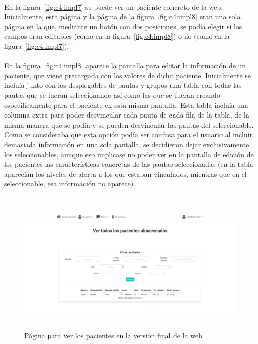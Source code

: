 \paragraph{}
En la figura~\ref{fig:c4:impl7} se puede ver un paciente concreto de la web. Inicialmente, esta página y la página de la figura~\ref{fig:c4:impl8} eran una sola página en la que, mediante un botón con dos posiciones, se podía elegir si los campos eran editables (como en la figura~\ref{fig:c4:impl8}) o no (como en la figura~\ref{fig:c4:impl7}).

\paragraph{}
En la figura~\ref{fig:c4:impl8} aparece la pantalla para editar la información de un paciente, que viene precargada con los valores de dicho paciente. Inicialmente se incluía junto con los desplegables de pautas y grupos una tabla con todas las pautas que se fueran seleccionando así como las que se fueran creando específicamente para el paciente en esta misma pantalla. Esta tabla incluía una columna extra para poder desvincular cada pauta de cada fila de la tabla, de la misma manera que se podía y se pueden desvincular las pautas del seleccionable. Como se consideraba que esta opción podía ser confusa para el usuario al incluir demasiada información en una sola pantalla, se decidieron dejar exclusivamente los seleccionables, aunque eso implicase no poder ver en la pantalla de edición de los pacientes las características concretas de las pautas seleccionadas (en la tabla aparecían los niveles de alerta a los que estaban vinculados, mientras que en el seleccionable, esa información no aparece).

\begin{figure}[H]
    \centering
    \includegraphics[height=7cm, width=\textwidth]{Imagenes/2-verPacientes.png}
    \caption[Página para ver los pacientes en la versión final de la web]{Página para ver los pacientes en la versión final de la web}
    \label{fig:c4:impl6}
\end{figure}

